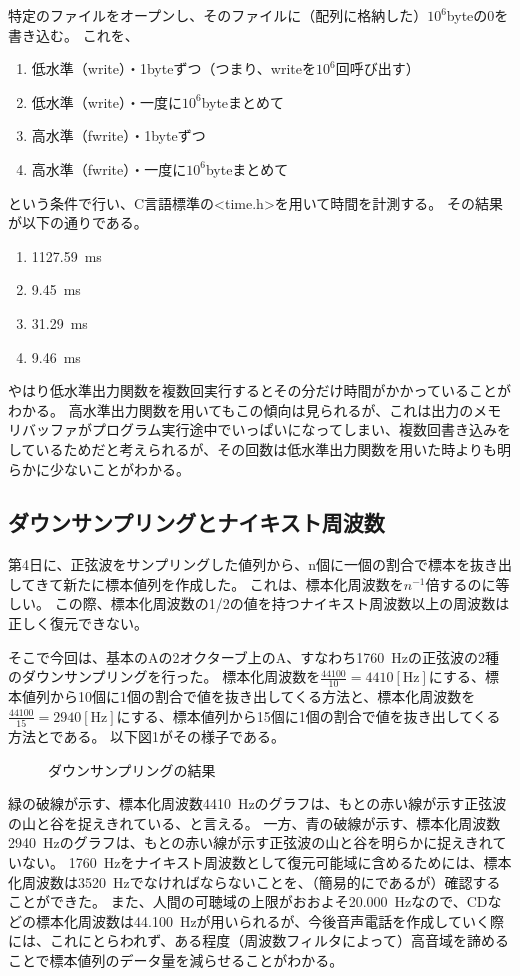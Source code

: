 \documentclass[10pt,a4j,dvipdfmx]{jsarticle}
\makeatletter
\let\@oldsubsec\subsection
\renewcommand{\subsection}[1]{\vspace{-7pt}\@oldsubsec{#1}}
\makeatother
\begin{document}
特定のファイルをオープンし、そのファイルに（配列に格納した）$10^6$byteの0を書き込む。
これを、
\begin{enumerate}
\item 低水準（write）・1byteずつ（つまり、writeを$10^6$回呼び出す）
\item 低水準（write）・一度に$10^6$byteまとめて
\item 高水準（fwrite）・1byteずつ
\item 高水準（fwrite）・一度に$10^6$byteまとめて
 \end{enumerate}
という条件で行い、C言語標準の<time.h>を用いて時間を計測する。
その結果が以下の通りである。
\begin{enumerate}
\item \SI{1127.59}{\milli\second}
\item \SI{9.45}{\milli\second}
\item \SI{31.29}{\milli\second}
\item \SI{9.46}{\milli\second}
\end{enumerate}
やはり低水準出力関数を複数回実行するとその分だけ時間がかかっていることがわかる。
高水準出力関数を用いてもこの傾向は見られるが、これは出力のメモリバッファがプログラム実行途中でいっぱいになってしまい、複数回書き込みをしているためだと考えられるが、その回数は低水準出力関数を用いた時よりも明らかに少ないことがわかる。

\subsection{ダウンサンプリングとナイキスト周波数}
第4日に、正弦波をサンプリングした値列から、n個に一個の割合で標本を抜き出してきて新たに標本値列を作成した。
これは、標本化周波数を$n^{-1}$倍するのに等しい。
この際、標本化周波数の1/2の値を持つナイキスト周波数以上の周波数は正しく復元できない。

そこで今回は、基本のAの2オクターブ上のA、すなわち\SI{1760}{\hertz}の正弦波の2種のダウンサンプリングを行った。
標本化周波数を$\frac{44100}{10} = 4410[\si{\hertz}]$にする、標本値列から10個に1個の割合で値を抜き出してくる方法と、標本化周波数を$\frac{44100}{15} = 2940[\si{\hertz}]$にする、標本値列から15個に1個の割合で値を抜き出してくる方法とである。
以下図1がその様子である。

\begin{figure}[H]
\centering

\caption{ダウンサンプリングの結果}
\label{fig:label}
\end{figure}

緑の破線が示す、標本化周波数\SI{4410}{\hertz}のグラフは、もとの赤い線が示す正弦波の山と谷を捉えきれている、と言える。
一方、青の破線が示す、標本化周波数\SI{2940}{\hertz}のグラフは、もとの赤い線が示す正弦波の山と谷を明らかに捉えきれていない。
\SI{1760}{\hertz}をナイキスト周波数として復元可能域に含めるためには、標本化周波数は\SI{3520}{\hertz}でなければならないことを、（簡易的にであるが）確認することができた。
また、人間の可聴域の上限がおおよそ\SI{20,000}{\hertz}なので、CDなどの標本化周波数は\SI{44,100}{\hertz}が用いられるが、今後音声電話を作成していく際には、これにとらわれず、ある程度（周波数フィルタによって）高音域を諦めることで標本値列のデータ量を減らせることがわかる。
\end{document}
